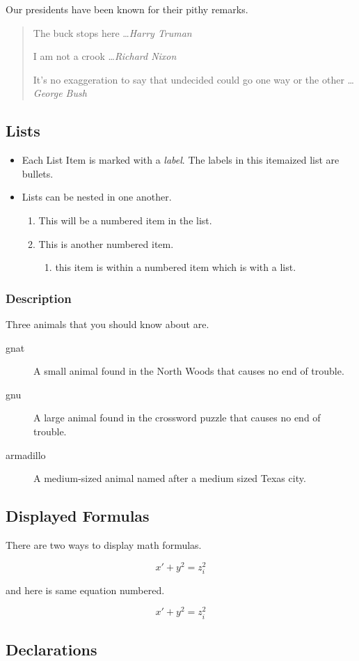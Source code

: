 \documentclass[twocolumn,12pt]{article}
\begin{document}
Our presidents have been known for their pithy remarks.
\begin{quotation}
  The buck stops here \ldots \emph{Harry Truman}

  I am not a crook \ldots \emph{Richard Nixon}

  It's no exaggeration to say that undecided could go one way or the other \ldots \emph{George Bush}
\end{quotation}

\subsection{Lists}
\begin{itemize}
  \item Each List Item is marked with a \emph {label}. The labels in this itemaized list are bullets.
  \item Lists can be nested in one another.
    \begin {enumerate}
    \item This will be a numbered item in the list.
    \item This is another numbered item.
      \begin {enumerate}
      \item this item is within a numbered item which is with a list.
      \end{enumerate}
      
    \end {enumerate}
\end{itemize}

\subsubsection{Description}
Three animals that you should know about are.
\begin{description}
\item[gnat] A small animal found in the North Woods that causes no end of trouble.
\item[gnu] A large animal found in the crossword puzzle that causes no end of trouble.
\item[armadillo] A medium-sized animal named after a medium sized Texas city.
\end{description}

\subsection{Displayed Formulas}
There are two ways to display math formulas.

\[x' + y^{2} = z_{i} ^ {2}\]

and here is same equation numbered.

\begin{equation}
  x' + y^{2} = z_{i} ^ {2}
\end{equation}

\subsection{Declarations}
\end{document}
